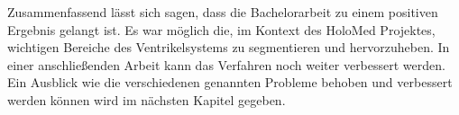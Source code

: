 Zusammenfassend lässt sich sagen, dass die Bachelorarbeit zu einem positiven Ergebnis gelangt ist. Es war möglich die, im Kontext des HoloMed Projektes, wichtigen Bereiche des Ventrikelsystems zu segmentieren und hervorzuheben.
\newline
In einer anschließenden Arbeit kann das Verfahren noch weiter verbessert werden. Ein Ausblick wie die verschiedenen genannten Probleme behoben und verbessert werden können wird im nächsten Kapitel gegeben.

























